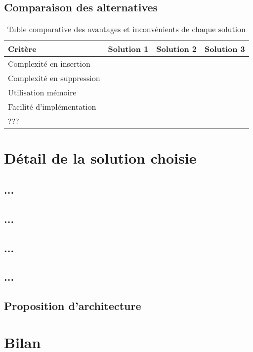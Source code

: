 \subsection{Comparaison des alternatives}
\begin{table}[H]
	\centering
	\caption{Table comparative des avantages et inconvénients de chaque solution}
	\begin{tabular}{l|c|c|c}
		Critère & Solution 1 & Solution 2 & Solution 3 \\
		\hline
		Complexité en insertion & & & \\
		Complexité en suppression & & & \\
		Utilisation mémoire & & & \\
		Facilité d'implémentation & & & \\
		??? & & &
	\end{tabular}
\end{table}



\section{Détail de la solution choisie}

\subsection{...}

\subsection{...}

\subsection{...}

\subsection{...}

\subsection{Proposition d'architecture}


\section{Bilan}

